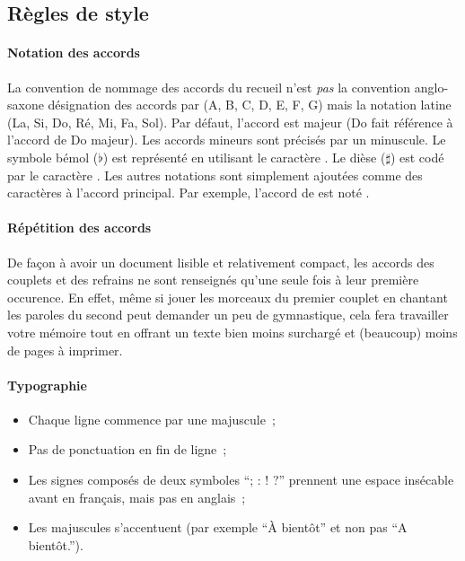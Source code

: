 \subsection{Règles de style}

\paragraph{Notation des accords}
La convention de nommage des accords du recueil n'est \emph{pas} la
convention anglo-saxone désignation des accords par (A, B, C, D, E, F,
G) mais la notation latine (La, Si, Do, Ré, Mi, Fa, Sol). Par défaut,
l'accord est majeur (Do fait référence à l'accord de Do majeur). Les
accords mineurs sont précisés par un  minuscule.  Le
symbole bémol ($\flat$) est représenté en utilisant le caractère
\command{\&}. Le dièse ($\sharp$) est codé par le caractère
\command{\#}. Les autres notations sont simplement ajoutées comme des
caractères à l'accord principal. Par exemple, l'accord de  est noté \latexcom{[La\&m]}.

\paragraph{Répétition des accords}
De façon à avoir un document lisible et relativement compact, les
accords des couplets et des refrains ne sont renseignés qu'une seule
fois à leur première occurence. En effet, même si jouer les morceaux
du premier couplet en chantant les paroles du second peut demander un
peu de gymnastique, cela fera travailler votre mémoire tout en offrant
un texte bien moins surchargé et (beaucoup) moins de pages à imprimer.

\paragraph{Typographie}
\begin{itemize}
  \item Chaque ligne commence par une majuscule~;
  \item Pas de ponctuation en fin de ligne~;
  \item Les signes composés de deux symboles ``; : ! ?'' prennent une
    espace insécable avant en français, mais pas en anglais~;
  \item Les majuscules s'accentuent (par exemple ``À bientôt'' et non
    pas ``A bientôt.'').
\end{itemize}


